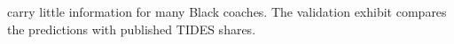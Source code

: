 \begin{table}[!h]
{\begin{threeparttable}
\begin{tablenotes}[para]
carry little information for many Black coaches. The validation exhibit compares the predictions with published TIDES shares.
\end{tablenotes}
\end{threeparttable}}
\end{table}

